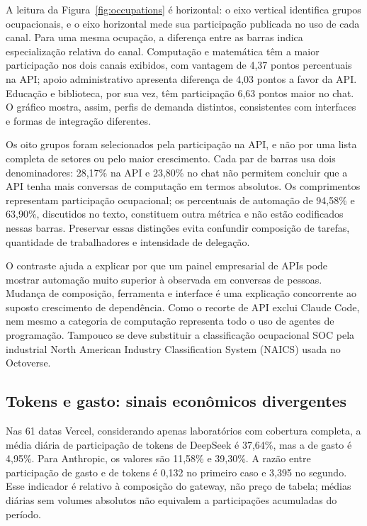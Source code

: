 \documentclass[11pt,a4paper]{article}
\begin{document}
A leitura da Figura~\ref{fig:occupations} é horizontal: o eixo vertical identifica grupos ocupacionais, e o eixo horizontal mede sua participação publicada no uso de cada canal. Para uma mesma ocupação, a diferença entre as barras indica especialização relativa do canal. Computação e matemática têm a maior participação nos dois canais exibidos, com vantagem de 4,37 pontos percentuais na API; apoio administrativo apresenta diferença de 4,03 pontos a favor da API. Educação e biblioteca, por sua vez, têm participação 6,63 pontos maior no chat. O gráfico mostra, assim, perfis de demanda distintos, consistentes com interfaces e formas de integração diferentes.

Os oito grupos foram selecionados pela participação na API, e não por uma lista completa de setores ou pelo maior crescimento. Cada par de barras usa dois denominadores: 28,17\% na API e 23,80\% no chat não permitem concluir que a API tenha mais conversas de computação em termos absolutos. Os comprimentos representam participação ocupacional; os percentuais de automação de 94,58\% e 63,90\%, discutidos no texto, constituem outra métrica e não estão codificados nessas barras. Preservar essas distinções evita confundir composição de tarefas, quantidade de trabalhadores e intensidade de delegação.

O contraste ajuda a explicar por que um painel empresarial de APIs pode mostrar automação muito superior à observada em conversas de pessoas. Mudança de composição, ferramenta e interface é uma explicação concorrente ao suposto crescimento de dependência. Como o recorte de API exclui Claude Code, nem mesmo a categoria de computação representa todo o uso de agentes de programação. Tampouco se deve substituir a classificação ocupacional SOC pela industrial North American Industry Classification System (NAICS) usada no Octoverse.

\subsection{Tokens e gasto: sinais econômicos divergentes}
Nas 61 datas Vercel, considerando apenas laboratórios com cobertura completa, a média diária de participação de tokens de DeepSeek é 37,64\%, mas a de gasto é 4,95\%. Para Anthropic, os valores são 11,58\% e 39,30\%. A razão entre participação de gasto e de tokens é 0,132 no primeiro caso e 3,395 no segundo. Esse indicador é relativo à composição do gateway, não preço de tabela; médias diárias sem volumes absolutos não equivalem a participações acumuladas do período.
\end{document}
